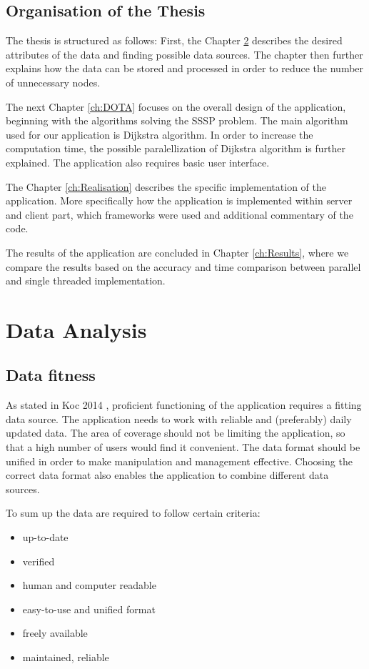 \documentclass[thesis=M,english]{FITthesis}[2012/10/20]
\begin{document}
\section{Organisation of the Thesis}
The thesis is structured as follows: First, the Chapter \ref{ch:DA} describes the desired attributes of the data and finding possible data sources. The chapter then further explains how the data can be stored and processed in order to reduce the number of unnecessary nodes. 

The next Chapter \ref{ch:DOTA} focuses on the overall design of the application, beginning with the algorithms solving the SSSP problem. The main algorithm used for our application is Dijkstra algorithm. In order to increase the computation time, the possible paralellization of Dijkstra algorithm is further explained. The application also requires basic user interface.

The Chapter \ref{ch:Realisation} describes the specific implementation of the application. More specifically how the application is implemented within server and client part, which frameworks were used and additional commentary of the code. 

The results of the application are concluded in Chapter \ref{ch:Results}, where we compare the results based on the accuracy and time comparison between parallel and single threaded implementation.


\chapter{Data Analysis}
\label{ch:DA}

\section{Data fitness}
\label{S1: Good data}
As stated in Koc 2014 \cite{Koc14}, proficient functioning of the application requires a fitting data source. The application needs to work with reliable and (preferably) daily updated data. The area of coverage should not be limiting the application, so that a high number of users would find it convenient. The data format should be unified in order to make manipulation and management effective. Choosing the correct data format also enables the application to combine different data sources.

To sum up the data are required to follow certain criteria:
\begin{itemize}
	\item up-to-date
	\item verified
	\item human and computer readable
	\item easy-to-use and unified format
	\item freely available
	\item maintained, reliable
\end{itemize}
\end{document}
